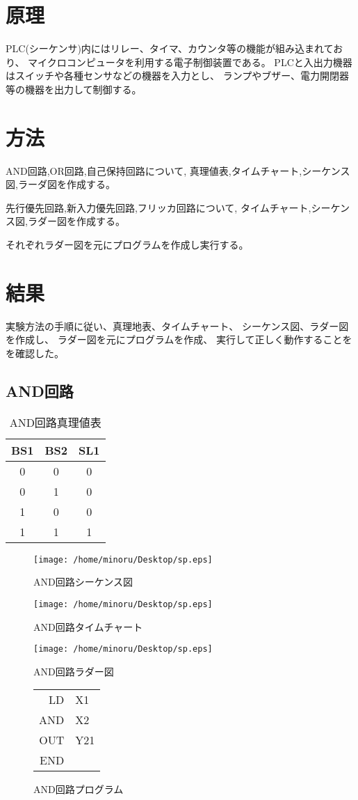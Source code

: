\documentclass{jsarticle}
\begin{document}
\section{原理}
PLC(シーケンサ)内にはリレー、タイマ、カウンタ等の機能が組み込まれており、
マイクロコンピュータを利用する電子制御装置である。
PLCと入出力機器はスイッチや各種センサなどの機器を入力とし、
ランプやブザー、電力開閉器等の機器を出力して制御する。
\section{方法}
AND回路,OR回路,自己保持回路について,
真理値表,タイムチャート,シーケンス図,ラーダ図を作成する。\par
先行優先回路,新入力優先回路,フリッカ回路について,
タイムチャート,シーケンス図,ラダー図を作成する。\par
それぞれラダー図を元にプログラムを作成し実行する。\newpage
\section{結果}
実験方法の手順に従い、真理地表、タイムチャート、
シーケンス図、ラダー図を作成し、
ラダー図を元にプログラムを作成、
実行して正しく動作することをを確認した。

\subsection{AND回路}
\begin{table}[hbtp]
 \caption{AND回路真理値表}
 \centering
 \begin{tabular}{|c|c|c|}\hline
 BS1&BS2&SL1\\ \hline\hline
 0&0&0\\ \hline
 0&1&0\\ \hline
 1&0&0\\ \hline
 1&1&1\\ \hline
 \end{tabular}
\end{table}

\begin{figure}[hbtp]
 \centering
 \texttt{[image: /home/minoru/Desktop/sp.eps]}
\end{figure}
\begin{figure}[hbtp]
 \caption{AND回路シーケンス図}
 \texttt{[image: /home/minoru/Desktop/sp.eps]}
 \caption{AND回路タイムチャート}
\end{figure}
\begin{figure}[hbtp]
 \texttt{[image: /home/minoru/Desktop/sp.eps]}
 \caption{AND回路ラダー図}
\end{figure}
\begin{figure}[hbtp]
\centering
\begin{tabular}{rl}
LD&X1\\
AND&X2\\
OUT&Y21\\
END&\\
\end{tabular}
\caption{AND回路プログラム}
\end{figure}
\newpage
\end{document}
